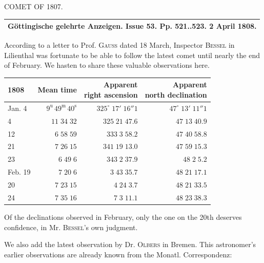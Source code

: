 \begin{center}
COMET OF 1807.
\end{center}

\begin{center}
\fontsize{10}{12}\selectfont\begin{tabular}{c}
\hline
Göttingische gelehrte Anzeigen. Issue 53. Pp. 521..523. 2 April 1808. \\
\hline
\end{tabular}
\end{center}

According to a letter to Prof. \textsc{Gauss} dated 18 March, Inspector \textsc{Bessel} in Lilienthal was fortunate to be able to follow the latest comet until nearly the end of February. We hasten to share these valuable observations here.


\begin{center}\fontsize{10}{12}\selectfont\setlength{\tabcolsep}{3pt}\renewcommand{\arraystretch}{1.15}\begin{tabular}{lrrr}
1808 & Mean time & \shortstack{Apparent\\right ascension} & \shortstack{Apparent\\north declination}\\\hline
Jan. 4 & $9^{\text{u}}\,49^{\text{m}}\,40^{\text{s}}$ & $325^\circ\;17'\;16''1$ & $47^\circ\;13'\;11''1$\\
4 & $11\;34\;32$ & $325\;21\;47.6$ & $47\;13\;40.9$\\
12 & $6\;58\;59$ & $333\;3\;58.2$ & $47\;40\;58.8$\\
21 & $7\;26\;15$ & $341\;19\;13.0$ & $47\;59\;15.3$\\
23 & $6\;49\;6$ & $343\;2\;37.9$ & $48\;2\;5.2$\\
Feb. 19 & $7\;20\;6$ & $3\;43\;35.7$ & $48\;21\;17.1$\\
20 & $7\;23\;15$ & $4\;24\;3.7$ & $48\;21\;33.5$\\
24 & $7\;35\;16$ & $7\;3\;11.1$ & $48\;23\;38.3$\\
\end{tabular}\end{center}

\par\indent Of the declinations observed in February, only the one on the 20th deserves confidence, in Mr. \textsc{Bessel}’s own judgment.

We also add the latest observation by Dr. \textsc{Olbers} in Bremen. This astronomer’s earlier observations are already known from the Monatl. Correspondenz:


